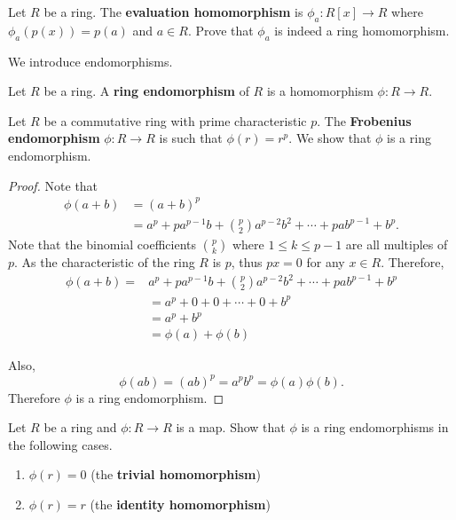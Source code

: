 \begin{exercise}
    Let $R$ be a ring. The \textbf{evaluation homomorphism} is $\phi_a: R[x] \to R$ where $\phi_a(p(x)) = p(a)$ and $a \in R$. Prove that $\phi_a$ is indeed a ring homomorphism.
\end{exercise}

We introduce endomorphisms.
\begin{definition}
    Let $R$ be a ring. A \textbf{ring endomorphism} of $R$ is a homomorphism $\phi: R \to R$.
\end{definition}
\begin{example}
    Let $R$ be a commutative ring with prime characteristic $p$. The \textbf{Frobenius endomorphism} $\phi: R \to R$ is such that $\phi(r) = r^p$. We show that $\phi$ is a ring endomorphism.
    
    \begin{proof}
        Note that
        \begin{align*}
            \phi(a+b) &= (a+b)^p\\
            &= a^p + pa^{p-1}b + {p \choose 2}a^{p-2}b^2 + \cdots + pab^{p-1} + b^p.
        \end{align*}
        Note that the binomial coefficients ${p \choose k}$ where $1 \leq k \leq p -1$ are all multiples of $p$. As the characteristic of the ring $R$ is $p$, thus $px = 0$ for any $x \in R$. Therefore,
        \begin{align*}
            \phi(a+b) = &a^p + pa^{p-1}b + {p \choose 2}a^{p-2}b^2 + \cdots + pab^{p-1} + b^p\\
            &= a^p + 0 + 0 + \cdots + 0 + b^p\\
            &= a^p + b^p\\
            &=\phi(a) + \phi(b)
        \end{align*}

        Also,
        \[
            \phi(ab) = (ab)^p = a^pb^p = \phi(a)\phi(b).
        \]
        Therefore $\phi$ is a ring endomorphism.
    \end{proof}
\end{example}

\begin{exercise}
    Let $R$ be a ring and $\phi: R \to R$ is a map. Show that $\phi$ is a ring endomorphisms in the following cases.
    \begin{enumerate}[label=(\alph*)]
        \item $\phi(r) = 0$ (the \textbf{trivial homomorphism})
        \item $\phi(r) = r$ (the \textbf{identity homomorphism})
    \end{enumerate}
\end{exercise}

